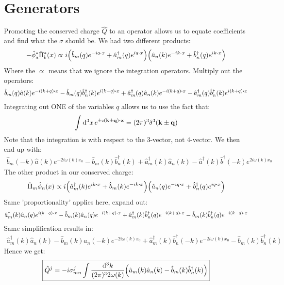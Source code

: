 \documentclass[12pt]{article}
\newcommand{\phih}{\hat{\phi}}
\newcommand{\phish}{\hat{\phi}^*}
\newcommand{\pih}{\hat{\Pi}}
\newcommand{\pish}{\hat{\Pi}^*}
\newcommand{\ahat}{\hat{a}}
\newcommand{\ahatd}{\hat{a}^\dag}
\newcommand{\bhat}{\hat{b}}
\newcommand{\bhatd}{\hat{b}^\dag}
\begin{document}
\section{Generators}
Promoting the conserved charge $\hat{Q}$ to an operator allows us to equate coefficients and find what the $\sigma$ should be. We had two different products:
\begin{align*}
  -\phish_a\pish_b(x)\propto
  i\qty(\bhat_m(q)e^{-iq\vdot x}+\ahatd_m(q)e^{iq\vdot x})
  \qty(\ahat_n(k)e^{-ik\vdot x}+\bhatd_n(q)e^{ik\vdot x})
\end{align*}
Where the $\propto$ means that we ignore the integration operators. Multiply out the operators:
\begin{align*}
  \bhat_m(q)\ahat(k)e^{-i(k+q)\vdot x}-\bhat_m(q)\bhatd_n(k)e^{i(k-q)\vdot x}
  +\ahatd_m(q)\ahat_n(k)e^{-i(k+q)\vdot x}-\ahatd_m(q)\bhatd_n(k)e^{i(k+q)\vdot x}
\end{align*}
Integrating out ONE of the variables $q$ allows us to use the fact that:
\begin{align*}
  \int\dd[3]{x}e^{\pm i(\vb{k}\pm \vb{q})\vdot \vb{x}}
  =(2\pi)^3\delta^3(\vb{k}\pm \vb{q})
\end{align*}
Note that the integration is with respect to the 3-vector, not 4-vector. We then end up with:
\begin{align*}
  \bhat_m(-k)\ahat(k)e^{-2i\omega(k)x_0}-\bhat_m(k)\bhatd_n(k)+
  \ahatd_m(k)\ahat_n(k)-\ahatd(k)\bhatd(-k)e^{2i\omega(k)x_0}
\end{align*}
The other product in our conserved charge:
\begin{align*}
  \pih_m\phih_n(x)\propto
  i\qty(\ahatd_m(k)e^{ik\vdot x}+\bhat_m(k)e^{-ik\vdot x})
  \qty(\ahat_n(q)e^{-iq\vdot x}+\bhatd_n(q)e^{iq\vdot x})
\end{align*}
Same 'proportionality' applies here, expand out:
\begin{align*}
  \ahatd_m(k)\ahat_n(q)e^{i(k-q)\vdot x}-\bhat_m(k)\ahat_n(q)e^{-i(k+q)\vdot x}+
  \ahatd_m(k)\bhatd_n(q)e^{-i(k+q)\vdot x}-\bhat_m(k)\bhatd_n(q)e^{-i(k-q)\vdot x}
\end{align*}
Same simplification results in:
\begin{align*}
  \ahatd_m(k)\ahat_n(k)-\bhat_m(k)\ahat_n(-k)e^{-2i\omega(k)x_0}+
  \ahatd_m(k)\bhatd_n(-k)e^{-2i\omega(k)x_0}-\bhat_m(k)\bhatd_n(k)
\end{align*}
Hence we get:
\begin{align*}
  \boxed{\hat{Q}^j=-i\sigma_{mn}^j\int\frac{\dd[3]{k}}{(2\pi)^32\omega(k)}
  \qty(\ahat_m(k)\ahat_n(k)-\bhat_m(k)\bhatd_n(k))}
\end{align*}
\end{document}
